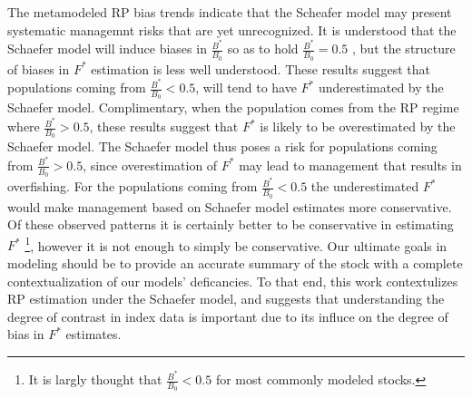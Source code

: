 %
The metamodeled RP bias trends indicate that the Scheafer model may present 
systematic managemnt risks that are yet unrecognized. It is understood that 
the Schaefer model will induce biases in $\frac{B^*}{B_0}$ so as to hold 
$\frac{B^*}{B_0}=0.5$ \cite{maunder_is_2003, prager_reply_2003}, but the 
structure of biases in $F^*$ estimation is less well understood. These results 
suggest that populations coming from $\frac{B^*}{B_0}<0.5$, will tend to have $F^*$ 
underestimated by the Schaefer model. Complimentary, when the population comes 
from the RP regime where $\frac{B^*}{B_0}>0.5$, these results suggest that $F^*$ 
is likely to be overestimated by the Schaefer model. The Schaefer model thus 
poses a risk for populations coming from $\frac{B^*}{B_0}>0.5$, since 
overestimation of $F^*$ may lead to management that results in overfishing. 
For the populations coming from $\frac{B^*}{B_0}<0.5$ the 
underestimated $F^*$ would make management based on Schaefer model 
estimates more conservative. Of these observed patterns it is certainly better 
to be conservative in estimating $F^*$
\footnote{It is largly thought that $\frac{B^*}{B_0}<0.5$ for most commonly modeled stocks.}, 
however it is not enough to simply be conservative. Our ultimate goals in 
modeling should be to provide an accurate summary of the stock with a complete 
contextualization of our models' deficancies. To that end, this work contextulizes
RP estimation under the Schaefer model, and suggests that understanding the 
degree of contrast in index data is important due to its influce on the degree of 
bias in $F^*$ estimates. 


